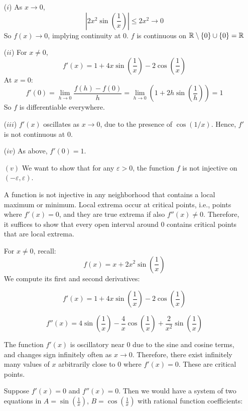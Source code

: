 \documentclass{report}
\begin{document}
\begin{itemize}
  \item[(\(i\))] As \(x \to 0\),
  \[
  \left|2x^2 \sin\left(\frac{1}{x}\right)\right| \leq 2x^2 \to 0
  \]
  So \(f(x) \to 0\), implying continuity at 0. \(f\) is continuous on \(\mathbb{R} \setminus \{0\}\cup \{0\} = \mathbb{R}\)

  \item[(\(ii\))] For \(x \neq 0\),
  \[
  f'(x) = 1 + 4x \sin\left(\frac{1}{x}\right) - 2 \cos\left(\frac{1}{x}\right)
  \]
  At \(x = 0\):
  \[
  f'(0) = \lim_{h \to 0} \frac{f(h) - f(0)}{h} = \lim_{h \to 0} \left(1 + 2h \sin\left(\frac{1}{h}\right)\right) = 1
  \]
  So \(f\) is differentiable everywhere.

  \item[(\(iii\))] \(f'(x)\) oscillates as \(x \to 0\), due to the presence of \(\cos(1/x)\). Hence, \(f'\) is not continuous at 0.

  \item[(\(iv\))] As above, \(f'(0) = 1\).

  \item[\((v)\)] 
We want to show that for any \(\varepsilon > 0\), the function \(f\) is not injective on \((-\varepsilon, \varepsilon)\).

A function is not injective in any neighborhood that contains a local maximum or minimum. Local extrema occur at critical points, i.e., points where \(f'(x) = 0\), and they are true extrema if also \(f''(x) \neq 0\). Therefore, it suffices to show that every open interval around 0 contains critical points that are local extrema.

For \(x \ne 0\), recall:
\[
f(x) = x + 2x^2 \sin\left(\frac{1}{x}\right)
\]
We compute its first and second derivatives:

\[
f'(x) = 1 + 4x \sin\left(\frac{1}{x}\right) - 2 \cos\left(\frac{1}{x}\right)
\]

\[
f''(x) = 4 \sin\left(\frac{1}{x}\right) - \frac{4}{x} \cos\left(\frac{1}{x}\right) + \frac{2}{x^2} \sin\left(\frac{1}{x}\right)
\]


The function \(f'(x)\) is oscillatory near 0 due to the sine and cosine terms, and changes sign infinitely often as \(x \to 0\). Therefore, there exist infinitely many values of \(x\) arbitrarily close to 0 where \(f'(x) = 0\). These are critical points.

Suppose \(f'(x) = 0\) and \(f''(x) = 0\). Then we would have a system of two equations in \(A = \sin\left(\frac{1}{x}\right)\), \(B = \cos\left(\frac{1}{x}\right)\) with rational function coefficients:


\end{itemize}
\end{document}
